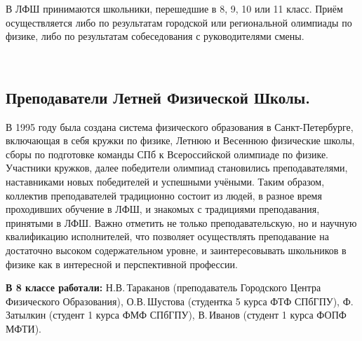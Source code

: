 \documentclass[12pt,a4paper,oneside]{scrartcl}
\newlength{\h}
\newlength{\x}
\begin{document}
В ЛФШ принимаются школьники, перешедшие в 8, 9, 10 или 11 класс. Приём
осуществляется либо по результатам городской или региональной
олимпиады по физике, либо по результатам собеседования с
руководителями смены.
\smallskip






\begin{figure}[h]
  \centering
  \hspace{0.05\textwidth}
  \\
\end{figure}


\subsection{Преподаватели Летней Физической Школы. }
\label{sec:teachers}

В 1995 году была создана система физического образования в
Санкт-Петербурге, включающая в себя кружки по физике, Летнюю и
Весеннюю физические школы, сборы по подготовке команды СПб к
Всероссийской олимпиаде по физике. Участники кружков, далее победители
олимпиад становились преподавателями, наставниками новых победителей и
успешными учёными. Таким образом, коллектив преподавателей традиционно
состоит из людей, в разное время проходивших обучение в ЛФШ, и
знакомых с традициями преподавания, принятыми в ЛФШ. Важно отметить не
только преподавательскую, но и научную квалификацию исполнителей, что
позволяет осуществлять преподавание на достаточно высоком
содержательном уровне, и заинтересовывать школьников в физике как в
интересной и перспективной профессии.

\textbf{В 8 классе работали:} Н.В.\,Тараканов (преподаватель Городского Центра
Физического Образования), О.В.\,Шустова (студентка 5 курса ФТФ СПбГПУ),
Ф.\,Затылкин (студент 1 курса ФМФ СПбГПУ), В.\,Иванов (студент 1 курса
ФОПФ МФТИ).

\begin{figure}[h]
  \centering
  \hspace{0.4cm}
  \hspace{0.4cm}
  \hspace{0.4cm}
\end{figure}
\end{document}
